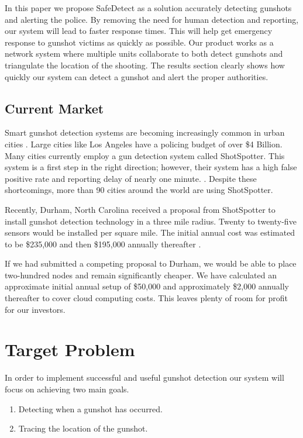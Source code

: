 \documentclass[conference]{IEEEtran}
\begin{document}
In this paper we propose SafeDetect as a solution accurately detecting gunshots and alerting the police. By removing the need for human detection and reporting, our system will lead to faster response times. This will help get emergency response to gunshot victims as quickly as possible. Our product works as a network system where multiple units collaborate to both detect gunshots and triangulate the location of the shooting. The results section clearly shows how quickly our system can detect a gunshot and alert the proper authorities. 


\subsection{Current Market}


Smart gunshot detection systems are becoming increasingly common in urban cities \cite{b2}. Large cities like Los Angeles have a policing budget of over \$4 Billion. Many cities currently employ a gun detection system called ShotSpotter. This system is a first step in the right direction; however, their system has a high false positive rate and reporting delay of nearly one minute.  \cite{b3}. Despite these shortcomings, more than 90 cities around the world are using ShotSpotter.

Recently, Durham, North Carolina received a proposal from ShotSpotter to install gunshot detection technology in a three mile radius. Twenty to twenty-five sensors would be installed per square mile. The initial annual cost was estimated to be \$235,000 and then \$195,000 annually thereafter \cite{b4}.

If we had submitted a competing proposal to Durham, we would be able to place two-hundred nodes and remain significantly cheaper. We have calculated an approximate initial annual setup of \$50,000 and approximately \$2,000 annually thereafter to cover cloud computing costs. This leaves plenty of room for profit for our investors. 



\section{Target Problem}

In order to implement successful and useful gunshot detection our system will focus on achieving two main goals.
\begin{enumerate}
\item Detecting when a gunshot has occurred.
\item Tracing the location of the gunshot.
\end{enumerate}
\end{document}
